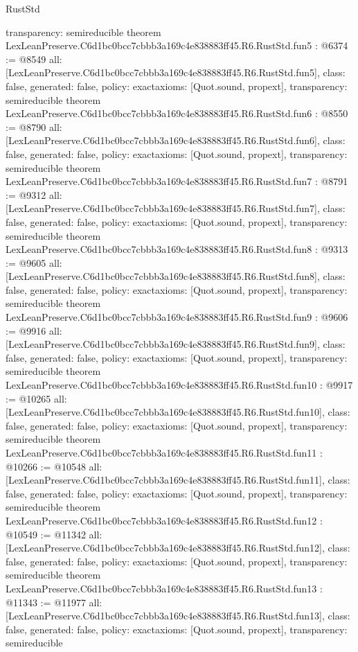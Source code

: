 \begin{lexlean}{RustStd}
\begin{coremodule}
{  transparency: semireducible
}
theorem LexLeanPreserve.C6d1bc0bcc7cbbb3a169c4e838883ff45.R6.RustStd.fun5 : @6374 := @8549 {
  all: [LexLeanPreserve.C6d1bc0bcc7cbbb3a169c4e838883ff45.R6.RustStd.fun5],
  class: false,
  generated: false,
  policy: exact{axioms: [Quot.sound, propext]},
  transparency: semireducible
}
theorem LexLeanPreserve.C6d1bc0bcc7cbbb3a169c4e838883ff45.R6.RustStd.fun6 : @8550 := @8790 {
  all: [LexLeanPreserve.C6d1bc0bcc7cbbb3a169c4e838883ff45.R6.RustStd.fun6],
  class: false,
  generated: false,
  policy: exact{axioms: [Quot.sound, propext]},
  transparency: semireducible
}
theorem LexLeanPreserve.C6d1bc0bcc7cbbb3a169c4e838883ff45.R6.RustStd.fun7 : @8791 := @9312 {
  all: [LexLeanPreserve.C6d1bc0bcc7cbbb3a169c4e838883ff45.R6.RustStd.fun7],
  class: false,
  generated: false,
  policy: exact{axioms: [Quot.sound, propext]},
  transparency: semireducible
}
theorem LexLeanPreserve.C6d1bc0bcc7cbbb3a169c4e838883ff45.R6.RustStd.fun8 : @9313 := @9605 {
  all: [LexLeanPreserve.C6d1bc0bcc7cbbb3a169c4e838883ff45.R6.RustStd.fun8],
  class: false,
  generated: false,
  policy: exact{axioms: [Quot.sound, propext]},
  transparency: semireducible
}
theorem LexLeanPreserve.C6d1bc0bcc7cbbb3a169c4e838883ff45.R6.RustStd.fun9 : @9606 := @9916 {
  all: [LexLeanPreserve.C6d1bc0bcc7cbbb3a169c4e838883ff45.R6.RustStd.fun9],
  class: false,
  generated: false,
  policy: exact{axioms: [Quot.sound, propext]},
  transparency: semireducible
}
theorem LexLeanPreserve.C6d1bc0bcc7cbbb3a169c4e838883ff45.R6.RustStd.fun10 : @9917 := @10265 {
  all: [LexLeanPreserve.C6d1bc0bcc7cbbb3a169c4e838883ff45.R6.RustStd.fun10],
  class: false,
  generated: false,
  policy: exact{axioms: [Quot.sound, propext]},
  transparency: semireducible
}
theorem LexLeanPreserve.C6d1bc0bcc7cbbb3a169c4e838883ff45.R6.RustStd.fun11 : @10266 := @10548 {
  all: [LexLeanPreserve.C6d1bc0bcc7cbbb3a169c4e838883ff45.R6.RustStd.fun11],
  class: false,
  generated: false,
  policy: exact{axioms: [Quot.sound, propext]},
  transparency: semireducible
}
theorem LexLeanPreserve.C6d1bc0bcc7cbbb3a169c4e838883ff45.R6.RustStd.fun12 : @10549 := @11342 {
  all: [LexLeanPreserve.C6d1bc0bcc7cbbb3a169c4e838883ff45.R6.RustStd.fun12],
  class: false,
  generated: false,
  policy: exact{axioms: [Quot.sound, propext]},
  transparency: semireducible
}
theorem LexLeanPreserve.C6d1bc0bcc7cbbb3a169c4e838883ff45.R6.RustStd.fun13 : @11343 := @11977 {
  all: [LexLeanPreserve.C6d1bc0bcc7cbbb3a169c4e838883ff45.R6.RustStd.fun13],
  class: false,
  generated: false,
  policy: exact{axioms: [Quot.sound, propext]},
  transparency: semireducible
}
\end{coremodule}
\end{lexlean}
